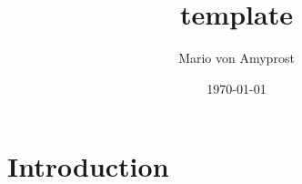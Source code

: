 \documentclass{article}
\title{template}
\author{Mario von Amyprost}
\date{\today}
\begin{document}
\maketitle

\section{Introduction}
\end{document}
